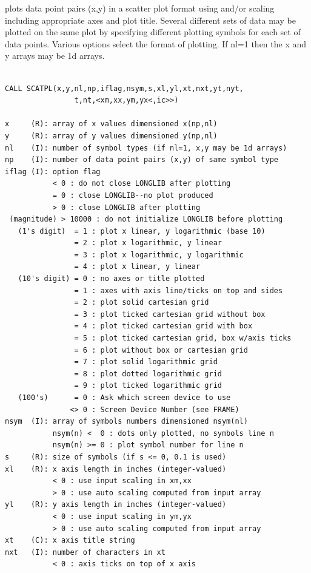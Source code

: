 \documentclass[11pt]{report}
\begin{document}
 plots data point pairs (x,y) in a scatter plot format using
 and/or  scaling including appropriate axes and plot title.
Several different sets of data may be plotted on the same plot by
specifying different plotting symbols for each set of data points.
Various options select the format of plotting.  If nl=1 then the x
and y arrays may be 1d arrays.
\begin{verbatim}

CALL SCATPL(x,y,nl,np,iflag,nsym,s,xl,yl,xt,nxt,yt,nyt,
                t,nt,<xm,xx,ym,yx<,ic>>)

x     (R): array of x values dimensioned x(np,nl)
y     (R): array of y values dimensioned y(np,nl)
nl    (I): number of symbol types (if nl=1, x,y may be 1d arrays)
np    (I): number of data point pairs (x,y) of same symbol type
iflag (I): option flag
           < 0 : do not close LONGLIB after plotting
           = 0 : close LONGLIB--no plot produced
           > 0 : close LONGLIB after plotting
 (magnitude) > 10000 : do not initialize LONGLIB before plotting
   (1's digit)  = 1 : plot x linear, y logarithmic (base 10)
                = 2 : plot x logarithmic, y linear
                = 3 : plot x logarithmic, y logarithmic
                = 4 : plot x linear, y linear
   (10's digit) = 0 : no axes or title plotted
                = 1 : axes with axis line/ticks on top and sides
                = 2 : plot solid cartesian grid
                = 3 : plot ticked cartesian grid without box
                = 4 : plot ticked cartesian grid with box
                = 5 : plot ticked cartesian grid, box w/axis ticks
                = 6 : plot without box or cartesian grid
                = 7 : plot solid logarithmic grid
                = 8 : plot dotted logarithmic grid
                = 9 : plot ticked logarithmic grid
   (100's)      = 0 : Ask which screen device to use
               <> 0 : Screen Device Number (see FRAME)
nsym  (I): array of symbols numbers dimensioned nsym(nl)
           nsym(n) <  0 : dots only plotted, no symbols line n
           nsym(n) >= 0 : plot symbol number for line n
s     (R): size of symbols (if s <= 0, 0.1 is used)
xl    (R): x axis length in inches (integer-valued)
           < 0 : use input scaling in xm,xx
           > 0 : use auto scaling computed from input array
yl    (R): y axis length in inches (integer-valued)
           < 0 : use input scaling in ym,yx
           > 0 : use auto scaling computed from input array
xt    (C): x axis title string
nxt   (I): number of characters in xt
           < 0 : axis ticks on top of x axis

\end{verbatim}
\end{document}

